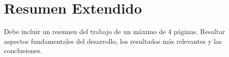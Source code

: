 \chapter{Resumen Extendido}
Debe incluir un resumen del trabajo de un máximo de 4 páginas. Resaltar aspectos fundamentales del desarrollo, los resultados más relevantes y las conclusiones.

